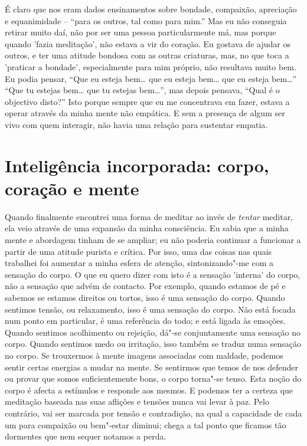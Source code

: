 É claro que nos eram dados ensinamentos sobre bondade, compaixão,
apreciação e equanimidade -- “para os outros, tal como para mim.” Mas eu
não conseguia retirar muito daí, não por ser uma pessoa particularmente
má, mas porque quando 'fazia meditação', não estava a vir do coração. Eu
gostava de ajudar os outros, e ter uma atitude bondosa com as outras
criaturas, mas, no que toca a 'praticar a bondade', especialmente para mim
próprio, não resultava muito bem. Eu podia pensar, “Que eu esteja bem\ldots{}
que eu esteja bem\ldots{} que eu esteja bem\ldots{}” “Que tu estejas bem\ldots{} que tu
estejas bem\ldots{}”, mas depois pensava, “Qual é o objectivo disto?” Isto
porque sempre que eu me concentrava em fazer, estava a operar através da
minha mente não empática. E sem a presença de algum ser vivo com quem
interagir, não havia uma relação para sustentar empatia.

\section{Inteligência incorporada: corpo, coração e mente}

Quando finalmente encontrei uma forma de meditar ao invés de
\emph{tentar} meditar, ela veio através de uma expansão da minha
consciência. Eu sabia que a minha mente e abordagem tinham de se
ampliar; eu não poderia continuar a funcionar a partir de uma atitude
purista e crítica. Por isso, uma das coisas nas quais trabalhei foi
aumentar a minha esfera de atenção, sintonizando"-me com a sensação do
corpo. O que eu quero dizer com isto é a sensação 'interna' do corpo,
não a sensação que advém de contacto. Por exemplo, quando estamos de pé
e sabemos se estamos direitos ou tortos, isso é uma sensação do corpo.
Quando sentimos tensão, ou relaxamento, isso é uma sensação do corpo.
Não está focada num ponto em particular, é uma referência do todo; e
está ligada às emoções. Quando sentimos acolhimento ou rejeição, dá"-se
conjuntamente uma sensação no corpo. Quando sentimos medo ou irritação,
isso também se traduz numa sensação no corpo. Se trouxermos à mente
imagens associadas com maldade, podemos sentir certas energias a mudar
na mente. Se sentirmos que temos de nos defender ou provar que somos
suficientemente bons, o corpo torna"-se tenso. Esta noção do corpo é
afecta a estímulos e responde aos mesmos. E podemos ter a certeza que
meditação baseada nas suas aflições e tensões nunca vai levar à paz.
Pelo contrário, vai ser marcada por tensão e contradição, na qual a
capacidade de cada um para compaixão ou bem"-estar diminui; chega a tal
ponto que ficamos tão dormentes que nem sequer notamos a perda.

